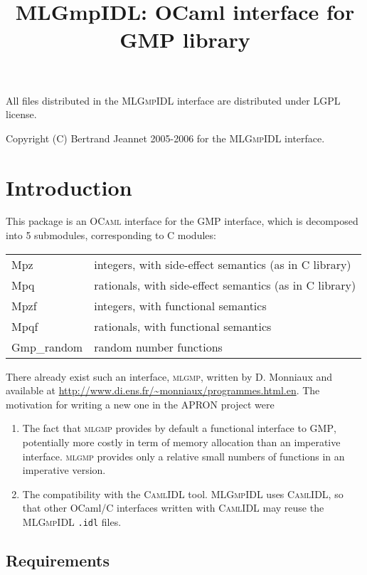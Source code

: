 \documentclass[[twoside,10pt,a4paper]{report}
\title{MLGmpIDL: OCaml interface for GMP library}
\begin{document}
\maketitle


\vspace*{0.9\textheight}

All files distributed in the \textsc{MLGmpIDL} interface are
distributed under LGPL license.

Copyright (C) Bertrand Jeannet 2005-2006 for the
\textsc{MLGmpIDL} interface.

\newpage

\section*{Introduction}

This package is an \textsc{OCaml} interface for the GMP
interface, which is decomposed into 5 submodules, corresponding to C
modules:

\noindent
\begin{tabular}{l@{~:~~}l}
Mpz        & integers, with side-effect semantics (as in C library) \\
Mpq        & rationals, with side-effect semantics (as in C library) \\
Mpzf       & integers, with functional semantics  \\
Mpqf       & rationals, with functional semantics \\
Gmp\_random & random number functions
\end{tabular}

There already exist such an interface, \textsc{mlgmp}, written by
D. Monniaux and available at
\url{http://www.di.ens.fr/~monniaux/programmes.html.en}. The
motivation for writing a new one in the APRON project were
\begin{enumerate}
\item The fact that \textsc{mlgmp} provides by default a
  functional interface to \textsc{GMP}, potentially more costly in
  term of memory allocation than an imperative interface.
  \textsc{mlgmp} provides only a relative small numbers of
  functions in an imperative version.
\item The compatibility with the \textsc{CamlIDL} tool.
  \textsc{MLGmpIDL} uses \textsc{CamlIDL}, so that other OCaml/C
  interfaces written with \textsc{CamlIDL} may reuse the
  \textsc{MLGmpIDL} \texttt{.idl} files.
\end{enumerate}

\subsection*{Requirements}
\end{document}
